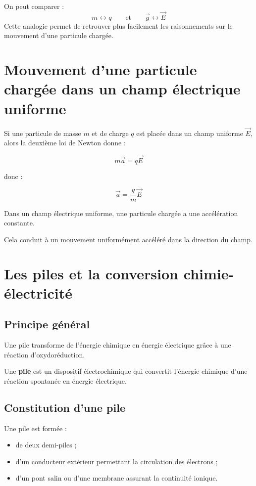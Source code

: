 \documentclass[11pt,a4paper]{article}
\begin{document}
\begin{analogie}
On peut comparer :
\[
m \longleftrightarrow q
\qquad \text{et} \qquad
\vec{g} \longleftrightarrow \vec{E}
\]
Cette analogie permet de retrouver plus facilement les raisonnements sur le mouvement d'une particule chargée.
\end{analogie}

\section{Mouvement d'une particule chargée dans un champ électrique uniforme}

Si une particule de masse \(m\) et de charge \(q\) est placée dans un champ uniforme \(\vec{E}\), alors la deuxième loi de Newton donne :

\[
m\vec{a} = q\vec{E}
\]

donc :

\[
\vec{a} = \frac{q}{m}\vec{E}
\]

\begin{propriete}
Dans un champ électrique uniforme, une particule chargée a une accélération constante.
\end{propriete}

Cela conduit à un mouvement uniformément accéléré dans la direction du champ.

\section{Les piles et la conversion chimie-électricité}

\subsection{Principe général}

Une pile transforme de l'énergie chimique en énergie électrique grâce à une réaction d'oxydoréduction.

\begin{definitionbox}
Une \textbf{pile} est un dispositif électrochimique qui convertit l'énergie chimique d'une réaction spontanée en énergie électrique.
\end{definitionbox}

\subsection{Constitution d'une pile}

Une pile est formée :
\begin{itemize}
    \item de deux demi-piles ;
    \item d'un conducteur extérieur permettant la circulation des électrons ;
    \item d'un pont salin ou d'une membrane assurant la continuité ionique.
\end{itemize}
\end{document}
